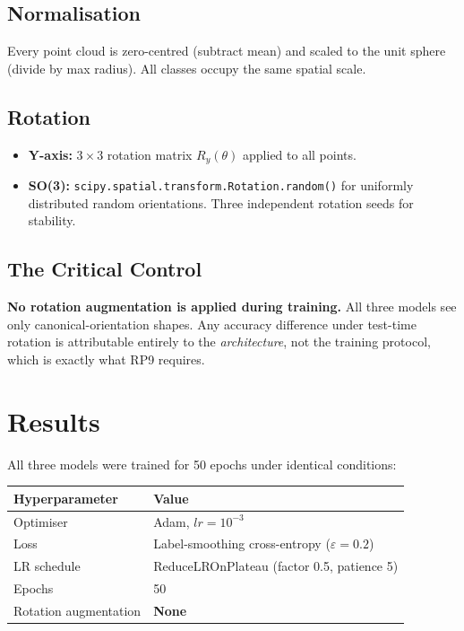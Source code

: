 \documentclass[12pt,a4paper]{article}
\begin{document}
\subsection*{Normalisation}

Every point cloud is zero-centred (subtract mean) and scaled to the unit sphere (divide by max radius). All classes occupy the same spatial scale.

\subsection*{Rotation}

\begin{itemize}[noitemsep, leftmargin=2em]
  \item \textbf{Y-axis:} $3\times3$ rotation matrix $R_y(\theta)$ applied to all points.
  \item \textbf{SO(3):} \texttt{scipy.spatial.transform.Rotation.random()} for uniformly distributed random orientations. Three independent rotation seeds for stability.
\end{itemize}

\subsection*{The Critical Control}

\begin{findingbox}
\textbf{No rotation augmentation is applied during training.} All three models see only canonical-orientation shapes. Any accuracy difference under test-time rotation is attributable entirely to the \emph{architecture}, not the training protocol, which is exactly what RP9 requires.
\end{findingbox}

\section{Results}

All three models were trained for 50 epochs under identical conditions:

\begin{center}
\begin{tabular}{ll}
\toprule
\textbf{Hyperparameter} & \textbf{Value} \\
\midrule
Optimiser & Adam, $lr = 10^{-3}$ \\
Loss & Label-smoothing cross-entropy ($\varepsilon = 0.2$) \\
LR schedule & ReduceLROnPlateau (factor 0.5, patience 5) \\
Epochs & 50 \\
Rotation augmentation & \textbf{None} \\
\bottomrule
\end{tabular}
\end{center}
\end{document}
